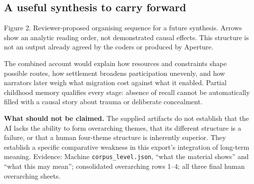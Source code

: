 \documentclass[10pt,a4paper]{article}
\newcommand{\source}[1]{{\footnotesize\color{muted}Evidence: #1}\par}
\begin{document}
\subsection*{A useful synthesis to carry forward}
{\footnotesize\color{muted}Figure 2. Reviewer-proposed organising sequence for a future synthesis. Arrows show an analytic reading order, not demonstrated causal effects. This structure is not an output already agreed by the coders or produced by Aperture.}

The combined account would explain how resources and constraints shape possible routes, how settlement broadens participation unevenly, and how narrators later weigh what migration cost against what it enabled. Partial childhood memory qualifies every stage: absence of recall cannot be automatically filled with a causal story about trauma or deliberate concealment.

\textbf{What should not be claimed.} The supplied artifacts do not establish that the AI lacks the ability to form overarching themes, that its different structure is a failure, or that a human four-theme structure is inherently superior. They establish a specific comparative weakness in this export's integration of long-term meaning.
\source{Machine \texttt{corpus\_level.json}, ``what the material shows'' and ``what this may mean''; consolidated overarching rows 1--4; all three final human overarching sheets.}


\end{document}
